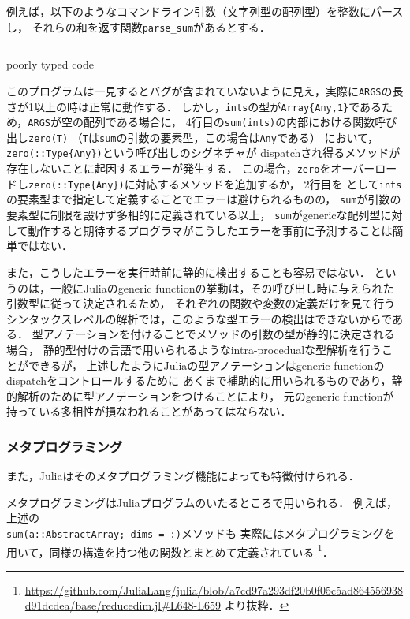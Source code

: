 例えば，以下のようなコマンドライン引数（文字列型の配列型）を整数にパースし，
それらの和を返す関数\verb|parse_sum|があるとする．

\begin{listing}[ht]
  \inputminted[frame=lines]{julia}{src/parse_sum.jl}
  \caption{poorly typed code}
  \label{lst:target1}
\end{listing}

このプログラムは一見するとバグが含まれていないように見え，実際に\verb|ARGS|の長さが1以上の時は正常に動作する．
しかし，\verb|ints|の型が\verb|Array{Any,1}|であるため，\verb|ARGS|が空の配列である場合に，
4行目の\verb|sum(ints)|の内部における関数呼び出し\verb|zero(T)|
（\verb|T|は\verb|sum|の引数の要素型，この場合は\verb|Any|である）
において， \verb|zero(::Type{Any})|という呼び出しのシグネチャが
dispatchされ得るメソッドが存在しないことに起因するエラーが発生する．
この場合，\verb|zero|をオーバーロードし\verb|zero(::Type{Any})|に対応するメソッドを追加するか，
2行目を  として\verb|ints|の要素型まで指定して定義することでエラーは避けられるものの，
\verb|sum|が引数の要素型に制限を設けず多相的に定義されている以上，
\verb|sum|がgenericな配列型に対して動作すると期待するプログラマがこうしたエラーを事前に予測することは簡単ではない．

また，こうしたエラーを実行時前に静的に検出することも容易ではない．
というのは，一般にJuliaのgeneric functionの挙動は，その呼び出し時に与えられた引数型に従って決定されるため，
それぞれの関数や変数の定義だけを見て行うシンタックスレベルの解析では，このような型エラーの検出はできないからである．
型アノテーションを付けることでメソッドの引数の型が静的に決定される場合，
静的型付けの言語で用いられるようなintra-procedualな型解析を行うことができるが，
上述したようにJuliaの型アノテーションはgeneric functionのdispatchをコントロールするために
あくまで補助的に用いられるものであり，静的解析のために型アノテーションをつけることにより，
元のgeneric functionが持っている多相性が損なわれることがあってはならない．

\subsubsection{メタプログラミング} \label{subsubsection: metaprogramming}

また，Juliaはそのメタプログラミング機能によっても特徴付けられる．

メタプログラミングはJuliaプログラムのいたるところで用いられる．
例えば，上述の\\\verb|sum(a::AbstractArray; dims = :)|メソッドも
実際にはメタプログラミングを用いて，同様の構造を持つ他の関数とまとめて定義されている
\footnote{
  \url{https://github.com/JuliaLang/julia/blob/a7cd97a293df20b0f05c5ad864556938d91dcdea/base/reducedim.jl\#L648-L659}
  より抜粋．
}．

